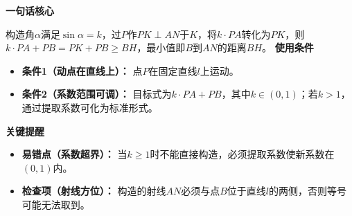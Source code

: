 \begin{summarybox}
	\textbf{\textcolor{CSummary}{一句话核心}}

	构造角$\alpha$满足$\sin\alpha=k$，过$P$作$PK\perp AN$于$K$，将$k\cdot PA$转化为$PK$，则$k\cdot PA+PB=PK+PB\ge BH$，最小值即$B$到$AN$的距离$BH$。
	\medskip
	\textbf{\textcolor{CSummary}{使用条件}}
	\begin{itemize}[leftmargin=*, itemsep=0.5em, topsep=0.4em]
		\item \textbf{条件1（动点在直线上）：} 点$P$在固定直线$l$上运动。
		\item \textbf{条件2（系数范围可调）：} 目标式为$k\cdot PA+PB$，其中$k\in(0,1)$；若$k>1$，通过提取系数可化为标准形式。
	\end{itemize}
	\medskip
	\textbf{\textcolor{CSummary}{关键提醒}}
	\begin{itemize}[leftmargin=*, itemsep=0.5em, topsep=0.4em]
		\item \textbf{易错点（系数超界）：} 当$k\ge1$时不能直接构造，必须提取系数使新系数在$(0,1)$内。
		\item \textbf{检查项（射线方位）：} 构造的射线$AN$必须与点$B$位于直线$l$的两侧，否则等号可能无法取到。
	\end{itemize}
\end{summarybox}
